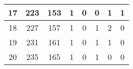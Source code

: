\begin{table}[!h]
\begin{tabular}{|c|c|c|c|c|c|c|c|}
		17                                                & 223                                               & 153                                               & 1                                                 & 0                                                 & 0                                                 & 1                                                 & 1                                                 \\ \hline
		18                                                & 227                                               & 157                                               & 1                                                 & 0                                                 & 1                                                 & 2                                                 & 0                                                 \\ \hline
		19                                                & 231                                               & 161                                               & 1                                                 & 0                                                 & 1                                                 & 1                                                 & 0                                                 \\ \hline
		20                                                & 235                                               & 165                                               & 1                                                 & 0                                                 & 1                                                 & 0                                                 & 0                                                 \\ \hline

\end{tabular}
\end{table}
